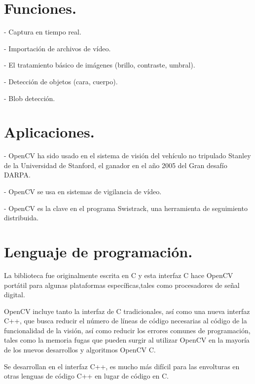 \section{Funciones.}

- Captura en tiempo real.

- Importación de archivos de vídeo.

- El tratamiento básico de imágenes (brillo, contraste, umbral).

- Detección de objetos (cara, cuerpo).

- Blob detección.

\section{Aplicaciones.}

- OpenCV ha sido usado en el sistema de visión del vehículo no tripulado Stanley de la Universidad de Stanford, el ganador en el año 2005 del Gran desafío DARPA.

- OpenCV se usa en sistemas de vigilancia de vídeo.

- OpenCV es la clave en el programa Swistrack, una herramienta de seguimiento distribuida.

\section{Lenguaje de programación.}

La biblioteca fue originalmente escrita en C y esta interfaz C hace OpenCV portátil para algunas plataformas específicas,tales como procesadores de señal digital.

OpenCV incluye tanto la interfaz de C tradicionales, así como una nueva interfaz C++, que busca reducir el número de líneas de código necesarias al código de la funcionalidad de la visión, así como reducir los errores comunes de programación, tales como la memoria fugas que pueden surgir al utilizar OpenCV en la mayoría de los nuevos desarrollos y algoritmos OpenCV C.

Se desarrollan en el interfaz C++, es mucho más difícil para las envolturas en otras lenguas de código C++ en lugar de código en C. \cite{SourceForceWebSite} \cite{UbaaWebSite} \cite{YahooWebSite}
